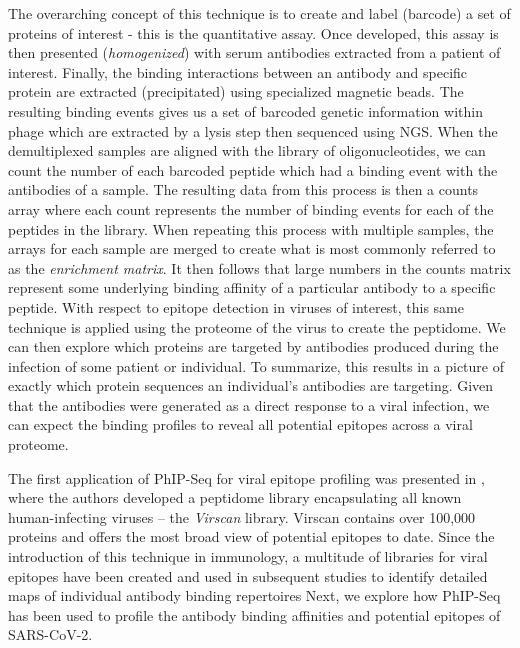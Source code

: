 \documentclass{article}
\begin{document}
The overarching concept of this technique is to create and label (barcode) a set of proteins of interest - this is the quantitative assay.
Once developed, this assay is then presented (\textit{homogenized}) with serum antibodies extracted from a patient of interest.
Finally, the binding interactions between an antibody and specific protein are extracted (precipitated) using specialized magnetic beads.
The resulting binding events gives us a set of barcoded genetic information within phage which are extracted by a lysis step then sequenced using NGS.
When the demultiplexed samples are aligned with the library of oligonucleotides, we can count the number of each barcoded peptide which had a binding event with the antibodies of a sample.
The resulting data from this process is then a counts array where each count represents the number of binding events for each of the peptides in the library.
When repeating this process with multiple samples, the arrays for each sample are merged to create what is most commonly referred to as the \textit{enrichment matrix}.
It then follows that large numbers in the counts matrix represent some underlying binding affinity of a particular antibody to a specific peptide.
With respect to epitope detection in viruses of interest, this same technique is applied using the proteome of the virus to create the peptidome.
We can then explore which proteins are targeted by antibodies produced during the infection of some patient or individual.
To summarize, this results in a picture of exactly which protein sequences an individual's antibodies are targeting.
Given that the antibodies were generated as a direct response to a viral infection, we can expect the binding profiles to reveal all potential epitopes across a viral proteome.

The first application of PhIP-Seq for viral epitope profiling was presented in \citet{Xu2015}, where the authors developed a peptidome library encapsulating all known human-infecting viruses -- the \textit{Virscan} library.
Virscan contains over 100,000 proteins and offers the most broad view of potential epitopes to date.
Since the introduction of this technique in immunology, a multitude of libraries for viral epitopes have been created and used in subsequent studies to identify detailed maps of individual antibody binding repertoires 
Next, we explore how PhIP-Seq has been used to profile the antibody binding affinities and potential epitopes of SARS-CoV-2.
\end{document}

